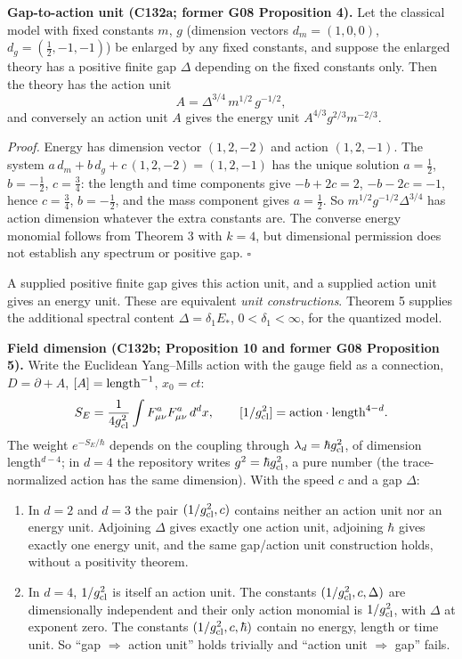 \documentclass[11pt,a4paper]{article}
\newcommand{\tightlist}{\setlength{\itemsep}{0pt}\setlength{\parskip}{0pt}}
\begin{document}
\textbf{Gap-to-action unit (C132a; former G08 Proposition 4).} Let the
classical model with fixed constants \(m\), \(g\) (dimension vectors
\(d_m=(1,0,0)\), \(d_g=(\tfrac12,-1,-1)\)) be enlarged by any fixed
constants, and suppose the enlarged theory has a positive finite gap
\(\Delta\) depending on the fixed constants only. Then the theory has
the action unit \[A=\Delta^{3/4}\,m^{1/2}\,g^{-1/2},\] and conversely an
action unit \(A\) gives the energy unit \(A^{4/3}g^{2/3}m^{-2/3}\).

\emph{Proof.} Energy has dimension vector \((1,2,-2)\) and action
\((1,2,-1)\). The system \(a\,d_m+b\,d_g+c\,(1,2,-2)=(1,2,-1)\) has the
unique solution \(a=\tfrac12\), \(b=-\tfrac12\), \(c=\tfrac34\): the
length and time components give \(-b+2c=2\), \(-b-2c=-1\), hence
\(c=\tfrac34\), \(b=-\tfrac12\), and the mass component gives
\(a=\tfrac12\). So \(m^{1/2}g^{-1/2}\Delta^{3/4}\) has action dimension
whatever the extra constants are. The converse energy monomial follows
from Theorem 3 with \(k=4\), but dimensional permission does not
establish any spectrum or positive gap. \(\square\)

A supplied positive finite gap gives this action unit, and a supplied
action unit gives an energy unit. These are equivalent \emph{unit
constructions}. Theorem 5 supplies the additional spectral content
\(\Delta=\delta_1{E_*}\), \(0<\delta_1<\infty\), for the quantized
model.

\textbf{Field dimension (C132b; Proposition 10 and former G08
Proposition 5).} Write the Euclidean Yang--Mills action with the gauge
field as a connection, \(D=\partial+A\), \([A]={\rm length}^{-1}\),
\(x_0=ct\):
\[S_E=\frac1{4g_{\rm cl}^2}\int F^a_{\mu\nu}F^a_{\mu\nu}\,d^dx,\qquad
[1/g_{\rm cl}^2]={\rm action}\cdot{\rm length}^{4-d}.\] The weight
\(e^{-S_E/\hbar}\) depends on the coupling through
\(\lambda_d=\hbar g_{\rm cl}^2\), of dimension length\(^{d-4}\); in
\(d=4\) the repository writes \(g^2=\hbar g_{\rm cl}^2\), a pure number
(the trace-normalized action has the same dimension). With the speed
\(c\) and a gap \(\Delta\):

\begin{enumerate}
\def\labelenumi{\arabic{enumi}.}
\tightlist
\item
  In \(d=2\) and \(d=3\) the pair \((1/g_{\rm cl}^2,c)\) contains
  neither an action unit nor an energy unit. Adjoining \(\Delta\) gives
  exactly one action unit, adjoining \(\hbar\) gives exactly one energy
  unit, and the same gap/action unit construction holds, without a
  positivity theorem.
\item
  In \(d=4\), \(1/g_{\rm cl}^2\) is itself an action unit. The constants
  \((1/g_{\rm cl}^2,c,\Delta)\) are dimensionally independent and their
  only action monomial is \(1/g_{\rm cl}^2\), with \(\Delta\) at
  exponent zero. The constants \((1/g_{\rm cl}^2,c,\hbar)\) contain no
  energy, length or time unit. So ``gap \(\Rightarrow\) action unit''
  holds trivially and ``action unit \(\Rightarrow\) gap'' fails.
\end{enumerate}
\end{document}
